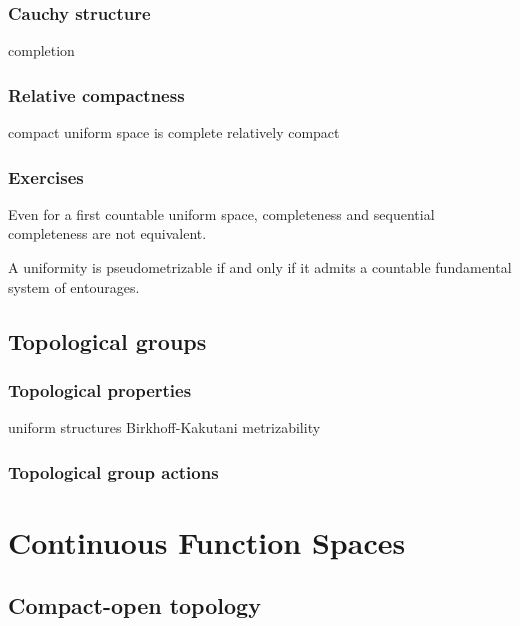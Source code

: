 \documentclass{../note}
\begin{document}
\section{Cauchy structure}
completion

\section{Relative compactness}
compact uniform space is complete
relatively compact

\section*{Exercises}
\begin{prb}
Even for a first countable uniform space, completeness and sequential completeness are not equivalent.
\end{prb}
\begin{prb}
A uniformity is pseudometrizable if and only if it admits a countable fundamental system of entourages.
\end{prb}










\chapter{Topological groups}

\section{Topological properties}
uniform structures
Birkhoff-Kakutani
metrizability

\section{Topological group actions}














\part{Continuous Function Spaces}
\chapter{Compact-open topology}
\end{document}

